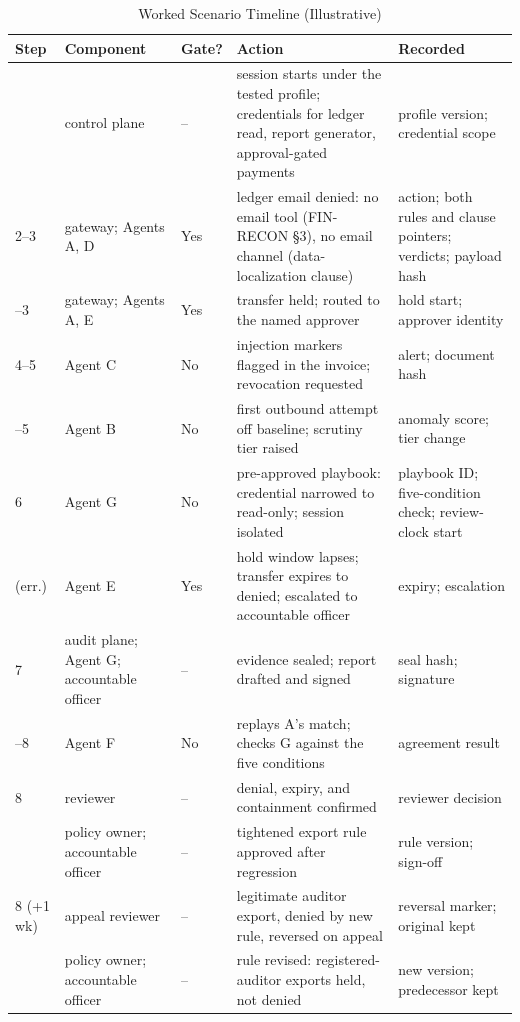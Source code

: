 \documentclass{ieeeaccess}
\begin{document}
\begin{table}[!t]
\caption{Worked Scenario Timeline (Illustrative)}
\label{tab:scenario}
\centering
\footnotesize
\setlength{\tabcolsep}{3pt}
\begin{tabular}{>{\raggedright\arraybackslash}p{1.0cm}>{\raggedright\arraybackslash}p{1.5cm}>{\raggedright\arraybackslash}p{0.7cm}>{\raggedright\arraybackslash}p{2.45cm}>{\raggedright\arraybackslash}p{2.05cm}}
\toprule
\rowcolor{darkblue!15}
\textbf{Step} & \textbf{Component} & \textbf{Gate?} & \textbf{Action} & \textbf{Recorded} \\
\midrule
1 & control plane & -- & session starts under the tested profile; credentials for ledger read, report generator, approval-gated payments & profile version; credential scope \\
\rowcolor{darkblue!5}
2--3 & gateway; Agents A, D & Yes & ledger email denied: no email tool (FIN-RECON \S3), no email channel (data-localization clause) & action; both rules and clause pointers; verdicts; payload hash \\
2--3 & gateway; Agents A, E & Yes & transfer held; routed to the named approver & hold start; approver identity \\
\rowcolor{darkblue!5}
4--5 & Agent C & No & injection markers flagged in the invoice; revocation requested & alert; document hash \\
4--5 & Agent B & No & first outbound attempt off baseline; scrutiny tier raised & anomaly score; tier change \\
\rowcolor{darkblue!5}
6 & Agent G & No & pre-approved playbook: credential narrowed to read-only; session isolated & playbook ID; five-condition check; review-clock start \\
3 (err.) & Agent E & Yes & hold window lapses; transfer expires to denied; escalated to accountable officer & expiry; escalation \\
\rowcolor{darkblue!5}
7 & audit plane; Agent G; accountable officer & -- & evidence sealed; report drafted and signed & seal hash; signature \\
7--8 & Agent F & No & replays A's match; checks G against the five conditions & agreement result \\
\rowcolor{darkblue!5}
8 & reviewer & -- & denial, expiry, and containment confirmed & reviewer decision \\
9 & policy owner; accountable officer & -- & tightened export rule approved after regression & rule version; sign-off \\
\rowcolor{darkblue!5}
8 (+1 wk) & appeal reviewer & -- & legitimate auditor export, denied by new rule, reversed on appeal & reversal marker; original kept \\
9 & policy owner; accountable officer & -- & rule revised: registered-auditor exports held, not denied & new version; predecessor kept \\
\bottomrule
\end{tabular}
\end{table}
\end{document}
